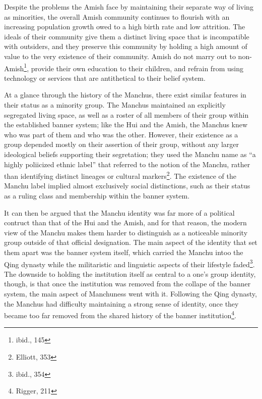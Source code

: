 Despite the problems the Amish face by maintaining their separate way of living
as minorities, the overall Amish community continues to flourish with an
increasing population growth owed to a high birth rate and low attrition.  The
ideals of their community give them a distinct living space that is incompatible
with outsiders, and they preserve this community by holding a high amount of
value to the very existence of their community. Amish do not marry out to
non-Amish\footnote{ibid., 145}, provide their own education to their children,
and refrain from using technology or services that are antithetical to their
belief system.

At a glance through the history of the Manchus, there exist similar features in
their status as a minority group. The Manchus maintained an explicitly
segregated living space, as well as a roster of all members of their group
within the established banner system; like the Hui and the Amish, the Manchus
knew who was part of them and who was the other. However, their existence as a
group depended mostly on their assertion of their group, without any larger
ideological beliefs supporting their segretation; they used the Manchu name as
``a highly poliicized ethnic label'' that referred to the notion of the Manchu,
rather than identifying distinct lineages or cultural markers\footnote{Elliott,
353}. The existence of the Manchu label implied almost exclusively social
distinctions, such as their status as a ruling class and membership within the
banner system.

It can then be argued that the Manchu identity was far more of a political
contruct than that of the Hui and the Amish, and for that reason, the modern
view of the Manchu makes them harder to distinguish as a noticeable minority
group outside of that official designation. The main aspect of the identity that
set them apart was the banner system itself, which carried the Manchu intoo the
Qing dynasty while the militaristic and linguistic aspects of their lifestyle
faded\footnote{ibid., 354}. The downside to holding the institution itself as
central to a one's group identity, though, is that once the institution was
removed from the collape of the banner system, the main aspect of Manchuness
went with it. Following the Qing dynasty, the Manchus had difficulty maintaining
a strong sense of identity, once they became too far removed from the shared
history of the banner institution\footnote{Rigger, 211}.


